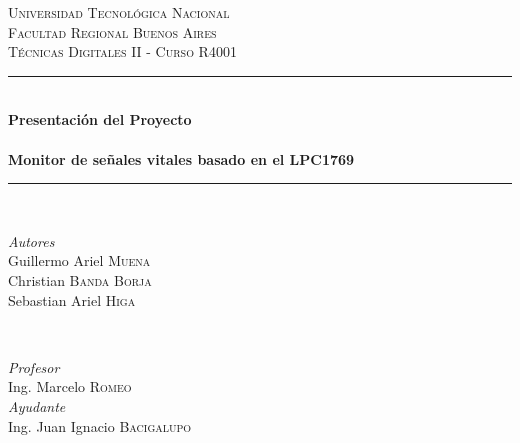 \documentclass[11pt]{report}
\begin{document}
	\begin{titlepage} %
		\newcommand{\HRule}{\rule{\linewidth}{0.5mm}} %
		
		\center %
		
		
		\textsc{\LARGE Universidad Tecnológica Nacional }\\[1.5cm] %
		
		\textsc{\Large Facultad Regional Buenos Aires}\\[0.5cm] %
		
		\textsc{\large Técnicas Digitales II - Curso R4001}\\[0.5cm] %
		
		
		\HRule\\[0.4cm]
		
		{\huge\bfseries Presentación del Proyecto \\ \hfill \\ \LARGE  Monitor de señales vitales basado en el LPC1769 }\\[0.8cm] 
		
		\HRule\\[1.5cm]
		
		
		\begin{minipage}{0.4\textwidth}
			\begin{flushleft}
				\large
				\textit{Autores}\\
				Guillermo Ariel 	\textsc{Muena} \\ %
				Christian 			   \textsc{Banda Borja} \\
				Sebastian Ariel 	\textsc{Higa} \\ 
			\end{flushleft}
		\end{minipage}
		~
		\begin{minipage}{0.4\textwidth}
			\begin{flushright}
				\large
				\textit{Profesor}\\
				Ing. Marcelo \textsc{Romeo} \\ 
				\textit{Ayudante}\\
				Ing. Juan Ignacio \textsc{Bacigalupo} \\
			\end{flushright}
		\end{minipage}
		

\end{titlepage}
\end{document}
